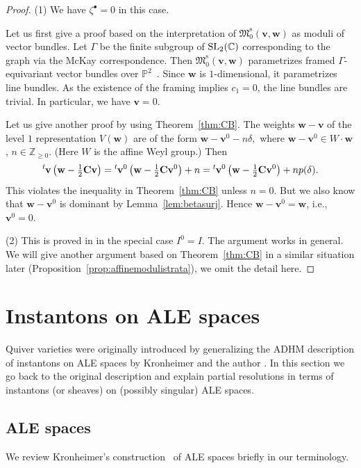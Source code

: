\documentclass[pdftex]{sigma}
\theoremstyle{definition}
\numberwithin{equation}{section}
\newcommand{\thmref}[1]{Theorem~\ref{#1}}
\newcommand{\lemref}[1]{Lemma~\ref{#1}}
\newcommand{\propref}[1]{Proposition~\ref{#1}}
\newcommand{\lsp}[2]{{\mskip-.3mu}{}^{#1}\mskip-1mu{#2}}
\newcommand{\C}{{\mathbb C}}
\newcommand{\Z}{{\mathbb Z}}
\newcommand{\proj}{{\mathbb P}}
\newcommand{\SL}{\operatorname{\rm SL}}
\newcommand{\M}{{\mathfrak M}} %
\newcommand{\Mreg}{\M^{\operatorname{s}}}
\newcommand{\bv}{{\mathbf v}} %
\newcommand{\bw}{{\mathbf w}} %
\newcommand{\bC}{{\mathbf C}} %
\begin{document}
\begin{proof}
(1) We have $\zeta^\bullet = 0$ in this case.

Let us f\/irst give a proof based on the interpretation of
$\Mreg_0(\bv,\bw)$ as moduli of vector bundles.
%
Let $\Gamma$ be the f\/inite subgroup of $\SL_2(\C)$ corresponding to
the graph via the McKay correspondence.
%
Then $\Mreg_0(\bv,\bw)$ parametrizes framed $\Gamma$-equivariant
vector bundles over $\proj^2$~\cite{Lecture}. Since $\bw$ is
$1$-dimensional, it parametrizes line bundles. As the existence of the
framing implies $c_1 = 0$, the line bundles are trivial. In
particular, we have $\bv = 0$.

Let us give another proof by using \thmref{thm:CB}. The weights $\bw -
\bv$ of the level $1$ representation $V(\bw)$ are of the form
\(
  \bw - \bv^0 - n\delta,
\)
where $\bw - \bv^0\in W\cdot \bw$, $n\in\Z_{\ge 0}$.
(Here $W$ is the af\/f\/ine Weyl group.)
Then
\[
   \lsp{t}{\bv}\left(\bw - \tfrac12 \bC \bv\right)
   = \lsp{t}{\bv^0}\left(\bw - \tfrac12 \bC \bv^0\right) + n
   = \lsp{t}{\bv^0}\left(\bw - \tfrac12 \bC \bv^0\right) + n p(\delta).
\]
This violates the inequality in \thmref{thm:CB} unless $n=0$. But we
also know that $\bw - \bv^0$ is dominant by \lemref{lem:betasurj}.
Hence $\bw - \bv^0 = \bw$, i.e., $\bv^0 = 0$.

(2) This is proved in \cite[10.5, 10.8]{Na-alg} in the special case
$I^0 = I$. The argument works in general. We will give another
argument based on \thmref{thm:CB} in a similar situation later
(\propref{prop:affinemodulistrata}), we omit the detail here.
\end{proof}


\section{Instantons on ALE spaces}\label{sec:instanton}

Quiver varieties were originally introduced by generalizing the ADHM
description of instantons on ALE spaces by Kronheimer and the author
\cite{KN}. In this section we go back to the original description and
explain partial resolutions in terms of instantons (or sheaves) on
(possibly singular) ALE spaces.

\subsection{ALE spaces}\label{subsec:ALE}

We review Kronheimer's construction~\cite{Kr} of ALE spaces brief\/ly in
our terminology.
\end{document}
